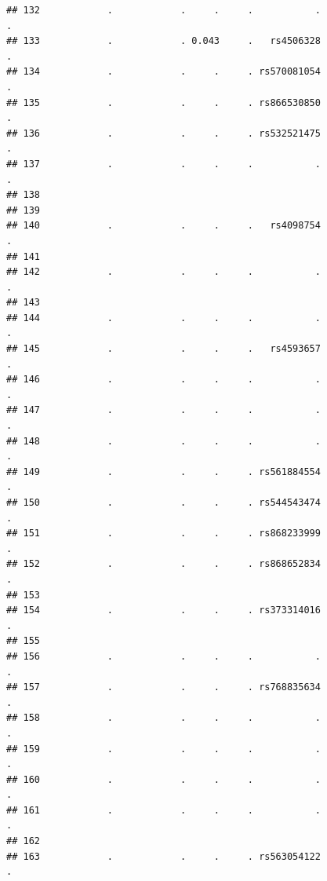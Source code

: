 \documentclass[
]{article}
\begin{document}
\begin{verbatim}
## 132            .            .     .     .           .                        .
## 133            .            . 0.043     .   rs4506328                        .
## 134            .            .     .     . rs570081054                        .
## 135            .            .     .     . rs866530850                        .
## 136            .            .     .     . rs532521475                        .
## 137            .            .     .     .           .                        .
## 138                                                                           
## 139                                                                           
## 140            .            .     .     .   rs4098754                        .
## 141                                                                           
## 142            .            .     .     .           .                        .
## 143                                                                           
## 144            .            .     .     .           .                        .
## 145            .            .     .     .   rs4593657                        .
## 146            .            .     .     .           .                        .
## 147            .            .     .     .           .                        .
## 148            .            .     .     .           .                        .
## 149            .            .     .     . rs561884554                        .
## 150            .            .     .     . rs544543474                        .
## 151            .            .     .     . rs868233999                        .
## 152            .            .     .     . rs868652834                        .
## 153                                                                           
## 154            .            .     .     . rs373314016                        .
## 155                                                                           
## 156            .            .     .     .           .                        .
## 157            .            .     .     . rs768835634                        .
## 158            .            .     .     .           .                        .
## 159            .            .     .     .           .                        .
## 160            .            .     .     .           .                        .
## 161            .            .     .     .           .                        .
## 162                                                                           
## 163            .            .     .     . rs563054122                        .

\end{verbatim}
\end{document}
